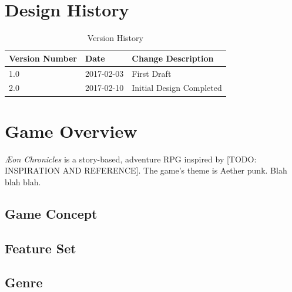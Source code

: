 \documentclass[12pt,titlepage]{article}
\title{\gametitle}
\subtitle{SUBTITLE?}
\author{Team Epsilon}
\date{\today}
\newcommand\gametitle{\textit{\AE on Chronicles}\xspace}
\begin{document}
\maketitle

\tableofcontents
\newpage
\listoffigures
\newpage
\listoftables


\newpage
\section{Design History}
\begin{table}[H]
    \caption{Version History}
    \label{tbl:version_history}
    \centering
    \begin{tabularx}{\linewidth}{| l | l || X |}
        \hline
        \textbf{Version Number} & \textbf{Date} & \textbf{Change Description} \\
        \hline\hline
        1.0 & 2017-02-03 & First Draft \\
        \hline
        2.0 & 2017-02-10 & Initial Design Completed \\
        \hline
    \end{tabularx}
\end{table}

\newpage
\section{Game Overview}
\gametitle is a story-based, adventure RPG inspired by [TODO: INSPIRATION AND
REFERENCE]. The game's theme is Aether punk. Blah blah blah.

\subsection{Game Concept}

\subsection{Feature Set}

\subsection{Genre}
\end{document}
